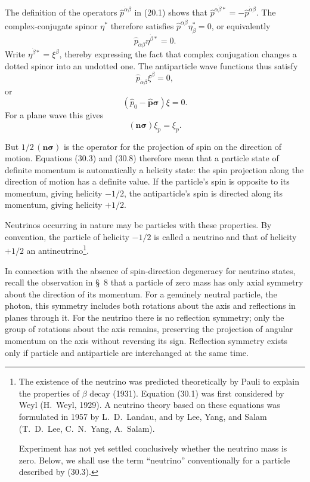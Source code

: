 The definition of the operators $\widehat p^{\dot\alpha\beta}$ in (20.1) shows that $\widehat p^{\alpha\dot\beta*}=-\widehat p^{\dot\alpha\beta}$. The complex-conjugate spinor $\eta^*$ therefore satisfies $\widehat p^{\alpha\dot\beta}\eta_{\dot\beta}^*=0$, or equivalently
\[
\widehat p_{\dot\alpha\beta}\eta^{\dot\beta*}=0.
\]
Write $\eta^{\dot\beta*}=\xi^\beta$, thereby expressing the fact that complex conjugation changes a dotted spinor into an undotted one. The antiparticle wave functions thus satisfy
\begin{equation}
\widehat p_{\dot\alpha\beta}\xi^\beta=0,
\tag{30.6}
\end{equation}
or
\begin{equation}
(\widehat p_0-\widehat{\mathbf p}\boldsymbol\sigma)\xi=0.
\tag{30.7}
\end{equation}
For a plane wave this gives
\begin{equation}
(\mathbf n\boldsymbol\sigma)\xi_p=\xi_p.
\tag{30.8}
\end{equation}

But $1/2\,(\mathbf n\boldsymbol\sigma)$ is the operator for the projection of spin on the direction of motion. Equations (30.3) and (30.8) therefore mean that a particle state of definite momentum is automatically a helicity state: the spin projection along the direction of motion has a definite value. If the particle's spin is opposite to its momentum, giving helicity $-1/2$, the antiparticle's spin is directed along its momentum, giving helicity $+1/2$.

Neutrinos occurring in nature may be particles with these properties. By convention, the particle of helicity $-1/2$ is called a neutrino and that of helicity $+1/2$ an antineutrino\footnote{The existence of the neutrino was predicted theoretically by Pauli to explain the properties of $\beta$ decay (1931). Equation (30.1) was first considered by Weyl (H.~Weyl, 1929). A neutrino theory based on these equations was formulated in 1957 by L.~D.~Landau, and by Lee, Yang, and Salam (T.~D.~Lee, C.~N.~Yang, A.~Salam).

Experiment has not yet settled conclusively whether the neutrino mass is zero. Below, we shall use the term ``neutrino'' conventionally for a particle described by (30.3).}.

In connection with the absence of spin-direction degeneracy for neutrino states, recall the observation in \S~8 that a particle of zero mass has only axial symmetry about the direction of its momentum. For a genuinely neutral particle, the photon, this symmetry includes both rotations about the axis and reflections in planes through it. For the neutrino there is no reflection symmetry; only the group of rotations about the axis remains, preserving the projection of angular momentum on the axis without reversing its sign. Reflection symmetry exists only if particle and antiparticle are interchanged at the same time.

